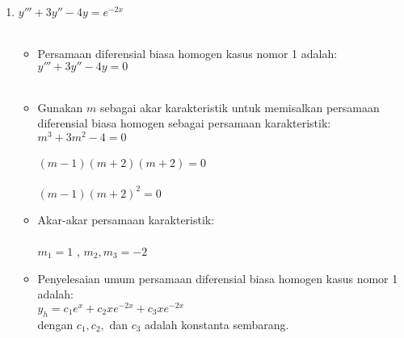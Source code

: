\begin{enumerate}[1.]

	\item \begin{math} y''' + 3y'' - 4y = e^{-2x} \end{math} \\ \\

	\begin{itemize}

	\item Persamaan diferensial biasa homogen kasus nomor 1 adalah: \\ 
	\begin{math} y''' + 3y'' - 4y = 0 \end{math} \\ \\
	\item Gunakan \begin{math} m \end{math} sebagai akar karakteristik untuk memisalkan persamaan diferensial biasa homogen sebagai persamaan karakteristik: \\ 
	\begin{math} m^{3} + 3m^{2} - 4 = 0 \end{math} \\ \\
	\begin{math} (m -1) (m + 2) (m +2) = 0 \end{math} \\ \\
	\begin{math} (m - 1) (m + 2)^{2} = 0  \end{math} \\ 
	\item Akar-akar persamaan karakteristik: \\ \\
	\begin{math} m_1 = 1 \end{math} , \begin{math} m_2, m_3 = -2 \end{math} \\ 
	\item Penyelesaian umum persamaan diferensial biasa homogen kasus nomor 1 adalah: \\ 
	\begin{math} y_h = c_1 e^{x} + c_2 xe^{-2x} + c_3 xe^{-2x} \end{math} \\
	dengan \begin{math} c_1, c_2, \end{math} dan \begin{math} c_3 \end{math} adalah konstanta sembarang. \\ 

\end{itemize}
\end{enumerate}
